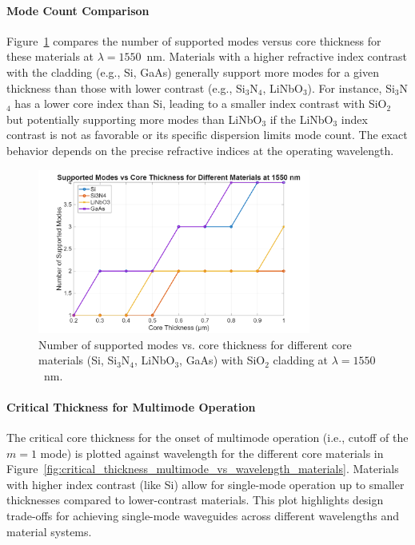 \documentclass[10pt, a4paper]{article}
\begin{document}
\paragraph{Mode Count Comparison}
Figure~\ref{fig:modes_vs_thickness_materials_1550nm} compares the number of supported modes versus core thickness for these materials at $\lambda = 1550$~nm. Materials with a higher refractive index contrast with the cladding (e.g., Si, GaAs) generally support more modes for a given thickness than those with lower contrast (e.g., Si$_3$N$_4$, LiNbO$_3$). For instance, Si$_3$N$_4$ has a lower core index than Si, leading to a smaller index contrast with SiO$_2$ but potentially supporting more modes than LiNbO$_3$ if the LiNbO$_3$ index contrast is not as favorable or its specific dispersion limits mode count. The exact behavior depends on the precise refractive indices at the operating wavelength.

\begin{figure}[h!]
    \centering
    \includegraphics[width=0.8\textwidth]{task1/modes_vs_thickness_materials_1550nm.png}
    \caption{Number of supported modes vs. core thickness for different core materials (Si, Si$_3$N$_4$, LiNbO$_3$, GaAs) with SiO$_2$ cladding at $\lambda = 1550$~nm.}
    \label{fig:modes_vs_thickness_materials_1550nm}
\end{figure}

\paragraph{Critical Thickness for Multimode Operation}
The critical core thickness for the onset of multimode operation (i.e., cutoff of the $m=1$ mode) is plotted against wavelength for the different core materials in Figure~\ref{fig:critical_thickness_multimode_vs_wavelength_materials}. Materials with higher index contrast (like Si) allow for single-mode operation up to smaller thicknesses compared to lower-contrast materials. This plot highlights design trade-offs for achieving single-mode waveguides across different wavelengths and material systems.
\end{document}
